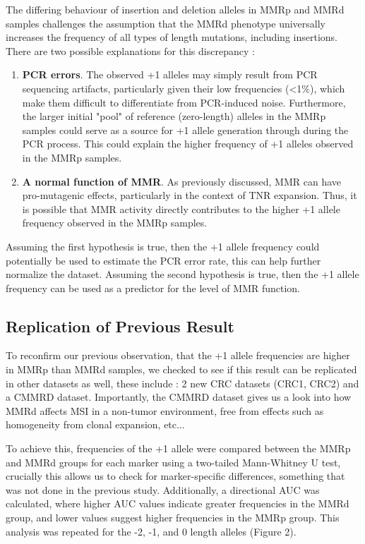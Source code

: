 \documentclass[fleqn,10pt]{olplainarticle}
\begin{document}
The differing behaviour of insertion and deletion alleles in MMRp and MMRd samples challenges the assumption that the MMRd phenotype universally increases the frequency of all types of length mutations, including insertions. There are two possible explanations for this discrepancy :

\begin{enumerate}

\item \textbf{PCR errors}. The observed +1 alleles may simply result from PCR sequencing artifacts, particularly given their low frequencies (<1\%), which make them difficult to differentiate from PCR-induced noise. Furthermore, the larger initial "pool" of reference (zero-length) alleles in the MMRp samples could serve as a source for +1 allele generation through during the PCR process. This could explain the higher frequency of +1 alleles observed in the MMRp samples.

\item \textbf{A normal function of MMR}. As previously discussed, MMR can have pro-mutagenic effects, particularly in the context of TNR expansion. Thus, it is possible that MMR activity directly contributes to the higher +1 allele frequency observed in the MMRp samples.

\end{enumerate}

Assuming the first hypothesis is true, then the +1 allele frequency could potentially be used to estimate the PCR error rate, this can help further normalize the dataset. Assuming the second hypothesis is true, then the +1 allele frequency can be used as a predictor for the level of MMR function.

\subsection{Replication of Previous Result}

To reconfirm our previous observation, that the +1 allele frequencies are higher in MMRp than MMRd samples, we checked to see if this result can be replicated in other datasets as well, these include : 2 new CRC datasets (CRC1, CRC2) and a CMMRD dataset. Importantly, the CMMRD dataset gives us a look into how MMRd affects MSI in a non-tumor environment, free from effects such as homogeneity from clonal expansion, etc...  

\newpage

To achieve this, frequencies of the +1 allele were compared between the MMRp and MMRd groups for each marker using a two-tailed Mann-Whitney U test, crucially this allows us to check for marker-specific differences, something that was not done in the previous study. Additionally, a directional AUC was calculated, where higher AUC values indicate greater frequencies in the MMRd group, and lower values suggest higher frequencies in the MMRp group. This analysis was repeated for the -2, -1, and 0 length alleles (Figure 2).
\end{document}
